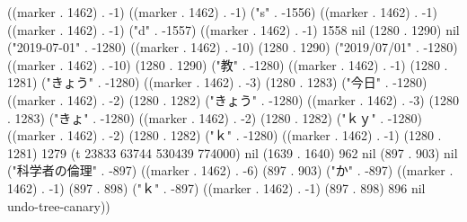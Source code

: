 ((marker . 1462) . -1) ((marker . 1462) . -1) ("s" . -1556) ((marker . 1462) . -1) ((marker . 1462) . -1) ("d" . -1557) ((marker . 1462) . -1) 1558 nil (1280 . 1290) nil ("2019-07-01" . -1280) ((marker . 1462) . -10) (1280 . 1290) ("2019/07/01" . -1280) ((marker . 1462) . -10) (1280 . 1290) ("教" . -1280) ((marker . 1462) . -1) (1280 . 1281) ("きょう" . -1280) ((marker . 1462) . -3) (1280 . 1283) ("今日" . -1280) ((marker . 1462) . -2) (1280 . 1282) ("きょう" . -1280) ((marker . 1462) . -3) (1280 . 1283) ("きょ" . -1280) ((marker . 1462) . -2) (1280 . 1282) ("ｋｙ" . -1280) ((marker . 1462) . -2) (1280 . 1282) ("ｋ" . -1280) ((marker . 1462) . -1) (1280 . 1281) 1279 (t 23833 63744 530439 774000) nil (1639 . 1640) 962 nil (897 . 903) nil ("科学者の倫理" . -897) ((marker . 1462) . -6) (897 . 903) ("か" . -897) ((marker . 1462) . -1) (897 . 898) ("ｋ" . -897) ((marker . 1462) . -1) (897 . 898) 896 nil undo-tree-canary))
